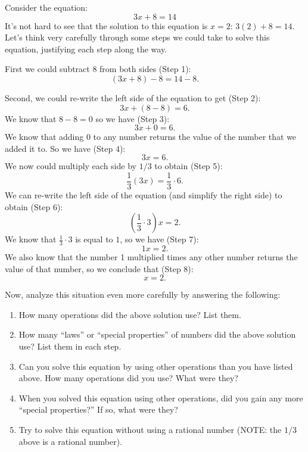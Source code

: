 \documentclass[11pt]{article}
\newenvironment{task}
	{\begin{mdframed}[linecolor=lightgray, linewidth=3pt]\raggedright}
	{\end{mdframed}}
\theoremstyle{definition}
\begin{document}
\begin{task}
  Consider the equation:
\[ 3x + 8 = 14 \]
It's not hard to see that the solution to this equation is $x=2$: $3(2)+8 = 14$. Let's think very carefully through some steps we 
could take to solve this equation, justifying each step along the way. 

First we could subtract $8$ from both sides (Step 1):
\[ (3x+8)-8 = 14 -8.\]

Second, we could re-write the left side of the equation to get (Step 2):
\[ 3x + (8-8) = 6.\]
We know that $8-8=0$ so we have (Step 3):
\[ 3x + 0 = 6.\]
We know that adding 0 to any number returns the value of the number that we added it to. So we have (Step 4):
\[ 3x = 6.\]
We now could multiply each side by $1/3$ to obtain (Step 5):
\[ \frac{1}{3}(3x) = \frac{1}{3}\cdot 6. \]
We can re-write the left side of the equation (and simplify the right side) to obtain (Step 6):
\[ \left( \frac{1}{3}\cdot 3 \right)x = 2. \]
We know that $\frac{1}{3}\cdot 3$ is equal to $1$, so we have (Step 7):
\[ 1x = 2.\]
We also know that the number 1 multiplied times any other number returns the value of that number, so we conclude that (Step 8):
\[ x = 2.\]

Now, analyze this situation even more carefully by answering the following:
\begin{enumerate}
  \item How many operations did the above solution use? List them.
  \item How many ``laws'' or ``special properties'' of numbers did the above solution use? List them in each step. 
  
  \item Can you solve this equation by using other operations than you have listed above. How many operations did you use? What were they? 
  \item When you solved this equation using other operations, did you gain any more ``special properties?'' If so, what were they?
  \item Try to solve this equation without using a rational number (NOTE: the $1/3$ above is a rational number).
\end{enumerate}
\end{task}
\newpage
\end{document}
